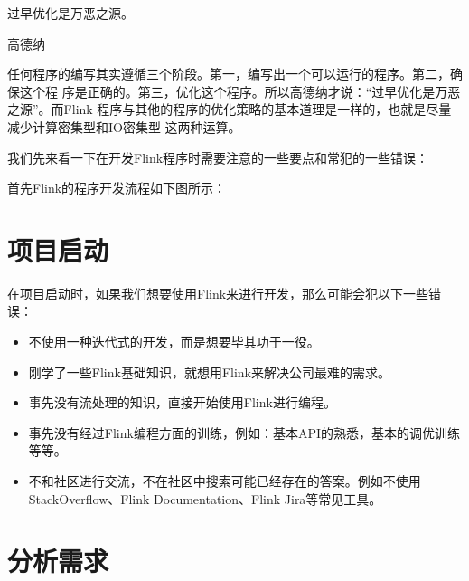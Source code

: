 \documentclass[cn,11pt,chinese]{elegantbook}
\begin{document}
\epigraph{过早优化是万恶之源。}{高德纳}

任何程序的编写其实遵循三个阶段。第一，编写出一个可以运行的程序。第二，确保这个程
序是正确的。第三，优化这个程序。所以高德纳才说：“过早优化是万恶之源”。而Flink
程序与其他的程序的优化策略的基本道理是一样的，也就是尽量减少计算密集型和IO密集型
这两种运算。

我们先来看一下在开发Flink程序时需要注意的一些要点和常犯的一些错误：

首先Flink的程序开发流程如下图所示：


\section{项目启动}

在项目启动时，如果我们想要使用Flink来进行开发，那么可能会犯以下一些错误：

\begin{itemize}
\item 不使用一种迭代式的开发，而是想要毕其功于一役。
\item 刚学了一些Flink基础知识，就想用Flink来解决公司最难的需求。
\item 事先没有流处理的知识，直接开始使用Flink进行编程。
\item 事先没有经过Flink编程方面的训练，例如：基本API的熟悉，基本的调优训练等等。
\item 不和社区进行交流，不在社区中搜索可能已经存在的答案。例如不使用
  StackOverflow、Flink Documentation、Flink Jira等常见工具。
\end{itemize}

\section{分析需求}
\end{document}
